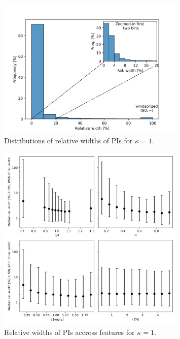\documentclass{article}
\theoremstyle{definition}
\begin{document}
\begin{figure}
\centering
\includegraphics[width=0.8\textwidth]{reports/figures/simulated_data/sim_kappa1_relative_widths.png}
\caption{Distributions of relative widths of PIs for $\kappa=1$.}
\end{figure}

\begin{figure}
\centering
\includegraphics[width=0.8\textwidth]{reports/figures/simulated_data/sim_kappa1_rel_widths_to_features.png}
\caption{Relative widths of PIs accross features for $\kappa=1$.}
\end{figure}
\end{document}
